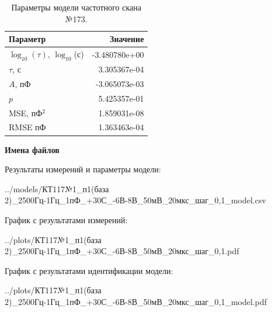 \begin{table}[!ht]
    \centering
    \caption{Параметры модели частотного скана №173.}
    \begin{tabular}{|l|r|}
        \hline
        Параметр                                       & Значение                  \\ \hline
        $\log_{10}(\tau)$, $\log_{10}$(с)              & -3.480780e+00             \\ \hline
        $\tau$, с                                      & 3.305367e-04              \\ \hline
        $A$, пФ                                        & -3.065073e-03             \\ \hline
        $p$                                            & 5.425357e-01              \\ \hline
        MSE, пФ$^2$                                    & 1.859031e-08              \\ \hline
        RMSE пФ                                        & 1.363463e-04              \\ \hline
    \end{tabular}
    \label{table:frequency_scan_model_173}
\end{table}

\textbf{Имена файлов}

Результаты измерений и параметры модели:

\scriptsize../models/КТ117№1\_п1(база 2)\_2500Гц-1Гц\_1пФ\_+30С\_-6В-8В\_50мВ\_20мкс\_шаг\_0,1\_model.csv
\normalsize

График с результатами измерений:

\scriptsize../plots/КТ117№1\_п1(база 2)\_2500Гц-1Гц\_1пФ\_+30С\_-6В-8В\_50мВ\_20мкс\_шаг\_0,1.pdf
\normalsize

График с результатами идентификации модели:

\scriptsize../plots/КТ117№1\_п1(база 2)\_2500Гц-1Гц\_1пФ\_+30С\_-6В-8В\_50мВ\_20мкс\_шаг\_0,1\_model.pdf
\normalsize

